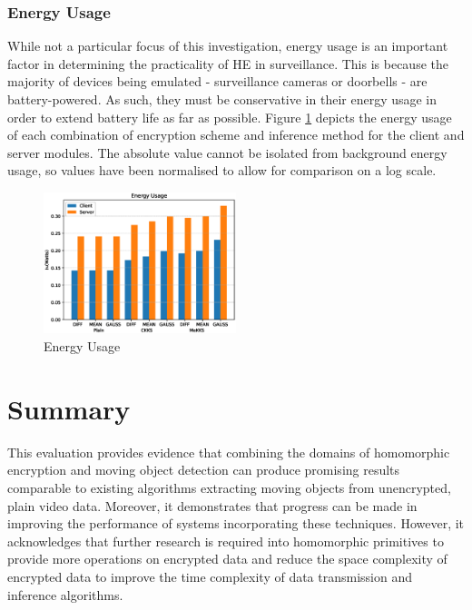 \subsubsection{Energy Usage}
\indent \indent
While not a particular focus of this investigation, energy usage is an important factor in determining the practicality of HE in surveillance. This is because the majority of devices being emulated - surveillance cameras or doorbells - are battery-powered. As such, they must be conservative in their energy usage in order to extend battery life as far as possible. Figure \ref{fig:energy} depicts the energy usage of each combination of encryption scheme and inference method for the client and server modules. The absolute value cannot  be isolated from background energy usage, so values have been normalised to allow for comparison on a log scale.
\begin{figure}[h!]
    \centering
    \includegraphics[width=0.5\textwidth]{figures/energyUsage}
    \caption{Energy Usage}
    \label{fig:energy}
\end{figure}



\section{Summary}
\indent \indent
This evaluation provides evidence that combining the domains of homomorphic encryption and moving object detection can produce promising results comparable to existing algorithms extracting moving objects from unencrypted, plain video data. Moreover, it demonstrates that progress can be made in improving the performance of systems incorporating these techniques. However, it acknowledges that further research is required into homomorphic primitives to provide more operations on encrypted data and reduce the space complexity of encrypted data to improve the time complexity of data transmission and inference algorithms.

